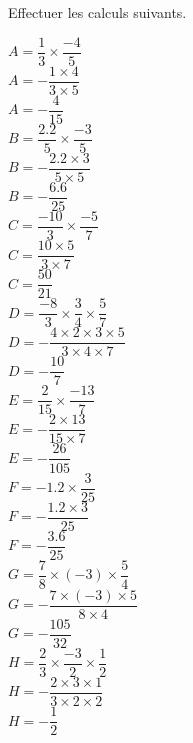 \begin{corrige}
    Effectuer les calculs suivants.
    \begin{spacing}{1.7}
        \begin{multicols}{2}
            \begin{itemize}
                \def\item{}
                \item $A=\dfrac{1}{3}\times\dfrac{-4}{5}$\\
                {\red $A=-\dfrac{1\times 4}{3\times 5}$\\$A=-\dfrac{4}{15}$}\\
                \item $B=\dfrac{\num{2.2}}{5}\times\dfrac{-3}{5}$\\
                {\red $B=-\dfrac{\num{2.2}\times 3}{5\times 5}$\\$B=-\dfrac{\num{6.6}}{25}$}\\
                \item $C=\dfrac{-10}{3}\times\dfrac{-5}{7}$\\
                {\red $C=\dfrac{10\times 5}{3\times 7}$\\$C=\dfrac{50}{21}$}\\
                \item $D=\dfrac{-8}{3}\times\dfrac{3}{4}\times\dfrac{5}{7}$\\
                {\red $D=-\dfrac{4\times 2\times 3\times 5}{3\times 4\times 7}$\\$D=-\dfrac{10}{7}$}\\
                \item $E=\dfrac{2}{15}\times\dfrac{-13}{7}$\\
                {\red $E=-\dfrac{2\times 13}{15\times 7}$\\$E=-\dfrac{26}{105}$}\\
                \item $F=\num{-1.2}\times\dfrac{3}{25}$\\
                {\red $F=-\dfrac{\num{1.2}\times3}{25}$\\$F=-\dfrac{\num{3.6}}{25}$}\\
                \item $G=\dfrac{7}{8}\times (-3)\times\dfrac{5}{4}$\\
                {\red $G=-\dfrac{7\times (-3)\times 5}{8\times 4}$\\$G=-\dfrac{105}{32}$}\\
                \item $H=\dfrac{2}{3}\times\dfrac{-3}{2}\times\dfrac{1}{2}$\\
                {\red $H=-\dfrac{2\times 3\times 1}{3\times 2\times 2}$\\$H=-\dfrac{1}{2}$}
            \end{itemize}
        \end{multicols}
    \end{spacing}
\end{corrige}

